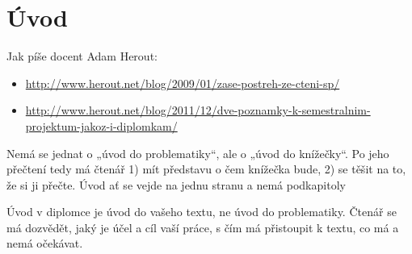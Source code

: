 \documentclass[12pt,oneside,final]{fithesis2}
\begin{document}
\FrontMatter
\ThesisTitlePage



\begin{ThesisDeclaration}
\DeclarationText
\AdvisorName
\end{ThesisDeclaration}












\tableofcontents



\MainMatter






\chapter{Úvod}
Jak píše docent Adam Herout:
\begin{itemize}
    \item \url{http://www.herout.net/blog/2009/01/zase-postreh-ze-cteni-sp/}
    \item \url{http://www.herout.net/blog/2011/12/dve-poznamky-k-semestralnim-projektum-jakoz-i-diplomkam/}
\end{itemize}

Nemá se jednat o „úvod do problematiky“, ale o „úvod do knížečky“. Po jeho přečtení tedy má čtenář 1) mít představu o čem knížečka bude, 2) se těšit na to, že si ji přečte. Úvod ať se vejde na jednu stranu a nemá podkapitoly

Úvod v diplomce je úvod do vašeho textu, ne úvod do problematiky. Čtenář se má dozvědět, jaký je účel a cíl vaší práce, s čím má přistoupit k textu, co má a nemá očekávat.
\end{document}
